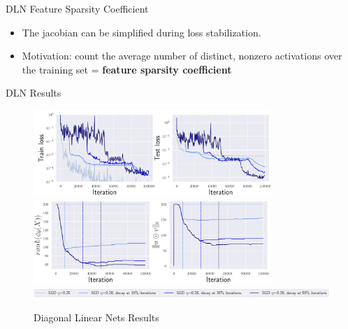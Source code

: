 \documentclass[fleqn]{beamer}
\begin{document}
    \begin{frame}{DLN Feature Sparsity Coefficient}
        \begin{itemize}
            \item The jacobian can be simplified during loss stabilization.
            \item Motivation: count the average number of distinct, nonzero
                activations over the training set = \textbf{feature sparsity
                coefficient}
        \end{itemize}
    \end{frame}

    \begin{frame}{DLN Results}
        \begin{figure}[htpb]
            \centering
            \includegraphics[width=0.8\textwidth,
            height=0.4\textheight]{./pics/dn_loss.png}
            \includegraphics[width=0.8\textwidth,
            height=0.4\textheight]{./pics/dn_sparsity.png}
            \includegraphics[width=\textwidth]{./pics/dn_setup.png}
            \caption{Diagonal Linear Nets Results}
        \end{figure}
    \end{frame}
\end{document}
